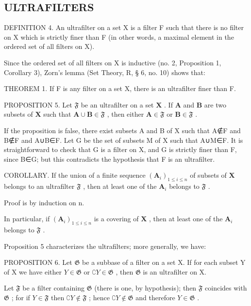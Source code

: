 \subsection{ULTRAFILTERS}

DEFINITION 4. An ultrafilter on a set X is a filter F such that there is no filter on X which is strictly finer than F (in other words, a maximal element in the ordered set of all filters on X).

Since the ordered set of all filters on X is inductive (no. 2, Proposition 1, Corollary 3), Zorn's lemma (Set Theory, R, § 6, no. 10) shows that:

THEOREM 1. If F is any filter on a set X, there is an ultrafilter finer than F.

PROPOSITION 5. Let \(\mathfrak{F}\) be an ultrafilter on a set \(\mathbf{X}\) . If \(\mathbf{A}\) and \(\mathbf{B}\) are two subsets of \(\mathbf{X}\) such that \(\mathbf{A} \cup \mathbf{B} \in \mathfrak{F}\) , then either \(\mathbf{A} \in \mathfrak{F}\) or \(\mathbf{B} \in \mathfrak{F}\) .

If the proposition is false, there exist subsets A and B of X such that A∉F and B∉F and A∪B∈F. Let G be the set of subsets M of X such that A∪M∈F. It is straightforward to check that G is a filter on X, and G is strictly finer than F, since B∈G; but this contradicts the hypothesis that F is an ultrafilter.

COROLLARY. If the union of a finite sequence \((\mathbf{A}_i)_{1 \leqslant i \leqslant n}\) of subsets of \(\mathbf{X}\) belongs to an ultrafilter \(\mathfrak{F}\) , then at least one of the \(\mathbf{A}_i\) belongs to \(\mathfrak{F}\) .

Proof is by induction on n.

In particular, if \((\mathbf{A}_i)_{1\leqslant i\leqslant n}\) is a covering of \(\mathbf{X}\) , then at least one of the \(\mathbf{A}_i\) belongs to \(\mathfrak{F}\) .

Proposition 5 characterizes the ultrafilters; more generally, we have:

PROPOSITION 6. Let \(\mathfrak{G}\) be a subbase of a filter on a set X. If for each subset Y of X we have either \(Y \in \mathfrak{G}\) or \(\complement Y \in \mathfrak{G}\) , then \(\mathfrak{G}\) is an ultrafilter on X.

Let \(\mathfrak{F}\) be a filter containing \(\mathfrak{G}\) (there is one, by hypothesis); then \(\mathfrak{F}\) coincides with \(\mathfrak{G}\) ; for if \(Y \in \mathfrak{F}\) then \(\complement Y \notin \mathfrak{F}\) ; hence \(\complement Y \notin \mathfrak{G}\) and therefore \(Y \in \mathfrak{G}\) .

